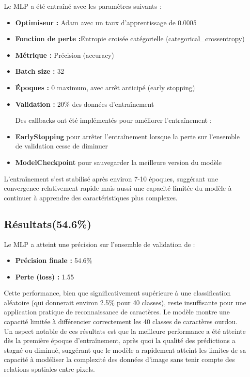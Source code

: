 \begin{flushleft}
Le MLP a été entraîné avec les paramètres suivants :

\begin{itemize}
\item \textbf{Optimiseur :} Adam avec un taux d'apprentissage de 0.0005
\item \textbf{Fonction de perte :}Entropie croisée catégorielle (categorical\_crossentropy)
\item \textbf{Métrique :} Précision (accuracy)
\item \textbf{Batch size :} 32
\item \textbf{Époques :} 0 maximum, avec arrêt anticipé (early stopping)
\item \textbf{Validation :} 20\% des données d'entraînement

Des callbacks ont été implémentés pour améliorer l'entraînement :

\item \textbf{EarlyStopping} pour arrêter l'entraînement lorsque la perte sur l'ensemble de validation cesse de diminuer
\item \textbf{ModelCheckpoint} pour sauvegarder la meilleure version du modèle
\end{itemize}


L'entraînement s'est stabilisé après environ 7-10 époques, suggérant une convergence relativement rapide mais aussi une capacité limitée du modèle à continuer à apprendre des caractéristiques plus complexes.
\end{flushleft}

\subsection{Résultats(54.6\%)}

\begin{flushleft}
Le MLP a atteint une précision sur l'ensemble de validation de :

\begin{itemize}
\item \textbf{Précision finale :} 54.6\%
\item \textbf{Perte (loss) :} 1.55
\end{itemize}
\bigskip
Cette performance, bien que significativement supérieure à une classification aléatoire (qui donnerait environ 2.5\% pour 40 classes), reste insuffisante pour une application pratique de reconnaissance de caractères. Le modèle montre une capacité limitée à différencier correctement les 40 classes de caractères ourdou.
\bigskip
Un aspect notable de ces résultats est que la meilleure performance a été atteinte dès la première époque d'entraînement, après quoi la qualité des prédictions a stagné ou diminué, suggérant que le modèle a rapidement atteint les limites de sa capacité à modéliser la complexité des données d'image sans tenir compte des relations spatiales entre pixels.
\end{flushleft}

